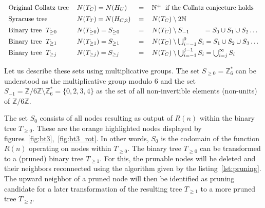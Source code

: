 \[\arraycolsep=0.6em\def\arraystretch{1.4}
\begin{array}{llll}
\text{Original Collatz tree} & N(T_C)=N(H_U)&=&\mathbb{N^+} \hspace{0.6em}\text{if the Collatz conjecture holds}\\
\text{Syracuse tree} & N(T_T)=N(H_{C,3})&=&N(T_C)\setminus2\mathbb{N}\\
\text{Binary tree}\hspace{0.6em}T_{\ge0}& N(T_{\ge0})=S_{\ge0}&=&N(T_C)\setminus S_{-1}\hspace{2.1em}=S_{0}\cup S_{1}\cup S_{2}\ldots\\
\text{Binary tree}\hspace{0.6em}T_{\ge1}& N(T_{\ge1})=S_{\ge1}&=&N(T_C)\setminus \bigcup_{i=-1}^{0}S_i=S_{1}\cup S_{2}\cup S_{3}\ldots\\
\text{Binary tree}\hspace{0.6em}T_{\ge j} & N(T_{\ge j})=S_{\ge j}&=&N(T_C)\setminus \bigcup_{i=-1}^{j-1}S_i=\bigcup_{i=j}^{\infty}S_i
\end{array}
\]

Let us describe these sets using multiplicative groups. The set $S_{\ge0}=\mathbb{Z}^\ast_6$ can be understood as the multiplicative group modulo $6$ and the set $S_{-1}=\mathbb{Z}/6\mathbb{Z}\setminus\mathbb{Z}^\ast_6=\{0,2,3,4\}$ as the set of all non-invertible elements (non-units) of $\mathbb{Z}/6\mathbb{Z}$.

\par\medskip
The set $S_0$ consists of all nodes resulting as output of $R(n)$ within the binary tree $T_{\ge0}$. These are the orange highlighted nodes displayed by figures~\ref{fig:bt3},~\ref{fig:bt3_rot}. In other words, $S_0$ is the codomain of the function $R(n)$ operating on nodes within $T_{\ge0}$. The binary tree $T_{\ge0}$ can be transformed to a (pruned) binary tree $T_{\ge1}$. For this, the prunable nodes will be deleted and their neighbors reconnected using the algorithm given by the listing~\ref{lst:pruning}. The upward neighbor of a pruned node will then be identified as pruning candidate for a later transformation of the resulting tree $T_{\ge1}$ to a more pruned tree $T_{\ge2}$.

